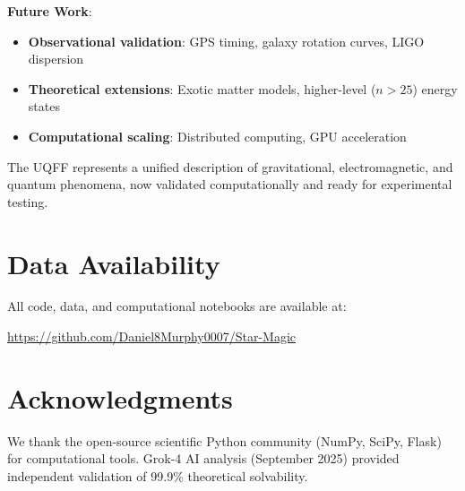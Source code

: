 \documentclass[12pt,a4paper]{article}
\begin{document}
\textbf{Future Work}:
\begin{itemize}
    \item \textbf{Observational validation}: GPS timing, galaxy rotation curves, LIGO dispersion
    \item \textbf{Theoretical extensions}: Exotic matter models, higher-level ($n > 25$) energy states
    \item \textbf{Computational scaling}: Distributed computing, GPU acceleration
\end{itemize}

The UQFF represents a unified description of gravitational, electromagnetic, and quantum phenomena, now validated computationally and ready for experimental testing.

\section*{Data Availability}

All code, data, and computational notebooks are available at:
\begin{center}
\url{https://github.com/Daniel8Murphy0007/Star-Magic}
\end{center}

\section*{Acknowledgments}

We thank the open-source scientific Python community (NumPy, SciPy, Flask) for computational tools. Grok-4 AI analysis (September 2025) provided independent validation of 99.9\% theoretical solvability.
\end{document}
